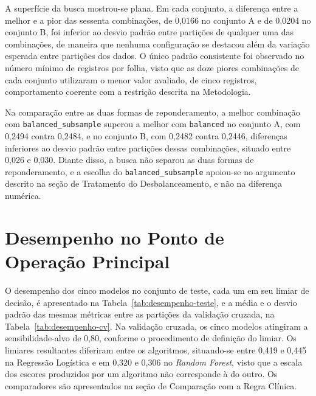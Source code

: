 A superfície da busca mostrou-se plana. Em cada conjunto, a diferença entre a melhor e a pior das sessenta combinações, de 0,0166 no conjunto A e de 0,0204 no conjunto B, foi inferior ao desvio padrão entre partições de qualquer uma das combinações, de maneira que nenhuma configuração se destacou além da variação esperada entre partições dos dados. O único padrão consistente foi observado no número mínimo de registros por folha, visto que as doze piores combinações de cada conjunto utilizaram o menor valor avaliado, de cinco registros, comportamento coerente com a restrição descrita na Metodologia.

Na comparação entre as duas formas de reponderamento, a melhor combinação com \texttt{balanced\_subsample} superou a melhor com \texttt{balanced} no conjunto A, com 0,2494 contra 0,2484, e no conjunto B, com 0,2482 contra 0,2446, diferenças inferiores ao desvio padrão entre partições dessas combinações, situado entre 0,026 e 0,030. Diante disso, a busca não separou as duas formas de reponderamento, e a escolha do \texttt{balanced\_subsample} apoiou-se no argumento descrito na seção de Tratamento do Desbalanceamento, e não na diferença numérica.

\section{Desempenho no Ponto de Operação Principal}\label{sec:res-desempenho}
O desempenho dos cinco modelos no conjunto de teste, cada um em seu limiar de decisão, é apresentado na Tabela~\ref{tab:desempenho-teste}, e a média e o desvio padrão das mesmas métricas entre as partições da validação cruzada, na Tabela~\ref{tab:desempenho-cv}. Na validação cruzada, os cinco modelos atingiram a sensibilidade-alvo de 0,80, conforme o procedimento de definição do limiar. Os limiares resultantes diferiram entre os algoritmos, situando-se entre 0,419 e 0,445 na Regressão Logística e em 0,320 e 0,306 no \textit{Random Forest}, visto que a escala dos escores produzidos por um algoritmo não corresponde à do outro. Os comparadores são apresentados na seção de Comparação com a Regra Clínica.

